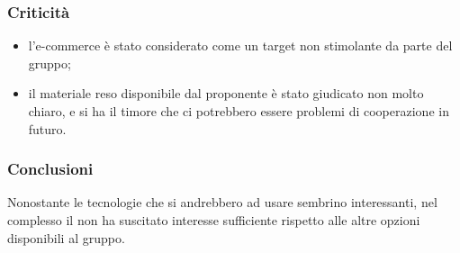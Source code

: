 \documentclass[]{article}
\begin{document}
			\subsubsection{Criticità}
			\begin{itemize}
			    \item l'e-commerce è stato considerato come un target non stimolante da parte del gruppo;
				\item il materiale reso disponibile dal proponente è stato giudicato non molto chiaro, e si ha il timore che ci potrebbero essere problemi di cooperazione in futuro.
			\end{itemize}

			\subsubsection{Conclusioni}
			Nonostante le tecnologie che si andrebbero ad usare sembrino interessanti, nel complesso il  non ha suscitato interesse sufficiente rispetto alle altre opzioni disponibili al gruppo.
		
		\newpage
\end{document}
